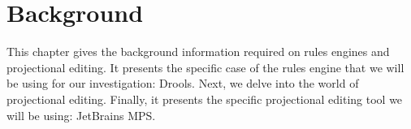 \chapter{Background}\label{chapter:Background}

This chapter gives the background information required on rules engines and projectional editing.
It presents the specific case of the rules engine that we will be using for our investigation: Drools.
Next, we delve into the world of projectional editing.
Finally, it presents the specific projectional editing tool we will be using: JetBrains MPS.



